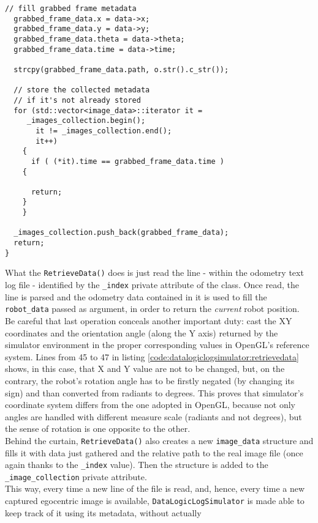 \begin{lstlisting}[caption={\texttt{DataLogicLogSimulator::RetrieveData()} method},
    label={code:datalogiclogsimulator:retrievedata}]
  // fill grabbed frame metadata
  grabbed_frame_data.x = data->x;
  grabbed_frame_data.y = data->y;
  grabbed_frame_data.theta = data->theta;
  grabbed_frame_data.time = data->time;

  strcpy(grabbed_frame_data.path, o.str().c_str());

  // store the collected metadata 
  // if it's not already stored
  for (std::vector<image_data>::iterator it =
	 _images_collection.begin();
       it != _images_collection.end();
       it++)
    {
      if ( (*it).time == grabbed_frame_data.time )
	{

	  return;
	}
    }

  _images_collection.push_back(grabbed_frame_data);
  return;
}
\end{lstlisting}

What the \texttt{RetrieveData()} does is just read the line - within the odometry
text log file - identified by the \texttt{\_index} private attribute of the class.
Once read, the line is parsed and the odometry data contained 
in it is used to fill the \texttt{robot\_data} passed as argument, in 
order to return the \textit{current} robot position.
\\
Be careful that last operation conceals another important duty: cast the
XY coordinates and the orientation angle (along the Y axis) returned
by the simulator environment in the proper corresponding values in OpenGL's
reference system. Lines from 45 to 47 in listing
\ref{code:datalogiclogsimulator:retrievedata} shows, in this case,
that X and Y value are not to be changed, but, on the contrary, the robot's
rotation angle has to be firstly negated (by changing its sign) and
than converted from radiants to degrees. This proves that simulator's coordinate
system differs from the one adopted in OpenGL, because not only angles
are handled with different measure scale (radiants and not degrees), but the
sense of rotation is one opposite to the other.
\\
Behind the curtain, \texttt{RetrieveData()} also creates a new 
\texttt{image\_data} structure and fills it with data just 
gathered and the relative path to the real image file (once again
thanks to the \texttt{\_index} value). Then the structure is added
to the \texttt{\_image\_collection} private attribute.
\\
This way, every time a new line of the file is read, and, hence, 
every time a new captured egocentric image is available, \texttt{DataLogicLogSimulator} 
is made able to keep track of it using its metadata, without actually 
